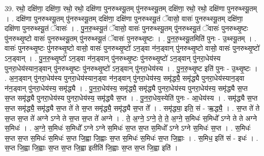 \documentclass[17pt]{extarticle}
\begin{document}
39. रथो॒ दक्षि॑णा॒ दक्षि॑णा॒ रथो॒ रथो॒ दक्षि॑णा पुनरुथ्स्यू॒तम् पु॑नरुथ्स्यू॒तम् दक्षि॑णा॒ रथो॒ रथो॒ दक्षि॑णा पुनरुथ्स्यू॒तम् । . दक्षि॑णा पुनरुथ्स्यू॒तम् पु॑नरुथ्स्यू॒तम् दक्षि॑णा॒ दक्षि॑णा पुनरुथ्स्यू॒तं ॅवासो॒ वासः॑ पुनरुथ्स्यू॒तम् दक्षि॑णा॒ दक्षि॑णा पुनरुथ्स्यू॒तं ॅवासः॑ । . पु॒न॒रु॒थ्स्यू॒तं ॅवासो॒ वासः॑ पुनरुथ्स्यू॒तम् पु॑नरुथ्स्यू॒तं ॅवासः॑ पुनरुथ्सृ॒ष्टः पु॑नरुथ्सृ॒ष्टो वासः॑ पुनरुथ्स्यू॒तम् पु॑नरुथ्स्यू॒तं ॅवासः॑ पुनरुथ्सृ॒ष्टः । . पु॒न॒रु॒थ्स्यू॒तमिति॑ पुनः - उ॒थ्स्यू॒तम् । . वासः॑ पुनरुथ्सृ॒ष्टः पु॑नरुथ्सृ॒ष्टो वासो॒ वासः॑ पुनरुथ्सृ॒ष्टो॑ ऽन॒ड्वा न॑न॒ड्वान् पु॑नरुथ्सृ॒ष्टो वासो॒ वासः॑ पुनरुथ्सृ॒ष्टो॑ ऽन॒ड्वान् । . पु॒न॒रु॒थ्सृ॒ष्टो॑ ऽन॒ड्वा न॑न॒ड्वान् पु॑नरुथ्सृ॒ष्टः पु॑नरुथ्सृ॒ष्टो॑ ऽन॒ड्वान् पु॑नरा॒धेय॑स्य पुनरा॒धेय॑स्यान॒ड्वान् पु॑नरुथ्सृ॒ष्टः पु॑नरुथ्सृ॒ष्टो॑ ऽन॒ड्वान् पु॑नरा॒धेय॑स्य । . पु॒न॒रु॒थ्सृ॒ष्ट इति॑ पुनः - उ॒थ्सृ॒ष्टः । . अ॒न॒ड्वान् पु॑नरा॒धेय॑स्य पुनरा॒धेय॑स्यान॒ड्वा न॑न॒ड्वान् पु॑नरा॒धेय॑स्य॒ समृ॑द्ध्यै॒ समृ॑द्ध्यै पुनरा॒धेय॑स्यान॒ड्वा न॑न॒ड्वान् पु॑नरा॒धेय॑स्य॒ समृ॑द्ध्यै । . पु॒न॒रा॒धेय॑स्य॒ समृ॑द्ध्यै॒ समृ॑द्ध्यै पुनरा॒धेय॑स्य पुनरा॒धेय॑स्य॒ समृ॑द्ध्यै स॒प्त स॒प्त समृ॑द्ध्यै पुनरा॒धेय॑स्य पुनरा॒धेय॑स्य॒ समृ॑द्ध्यै स॒प्त । . पु॒न॒रा॒धेय॒स्येति॑ पुनः - आ॒धेय॑स्य । . समृ॑द्ध्यै स॒प्त स॒प्त समृ॑द्ध्यै॒ समृ॑द्ध्यै स॒प्त ते॑ ते स॒प्त समृ॑द्ध्यै॒ समृ॑द्ध्यै स॒प्त ते᳚ । . समृ॑द्ध्या॒ इति॒ सं - ऋ॒द्ध्यै॒ । . स॒प्त ते॑ ते स॒प्त स॒प्त ते॑ अग्ने ऽग्ने ते स॒प्त स॒प्त ते॑ अग्ने । . ते॒ अ॒ग्ने॒ ऽग्ने॒ ते॒ ते॒ अ॒ग्ने॒ स॒मिधः॑ स॒मिधो᳚ ऽग्ने ते ते अग्ने स॒मिधः॑ । . अ॒ग्ने॒ स॒मिधः॑ स॒मिधो᳚ ऽग्ने ऽग्ने स॒मिधः॑ स॒प्त स॒प्त स॒मिधो᳚ ऽग्ने ऽग्ने स॒मिधः॑ स॒प्त । . स॒मिधः॑ स॒प्त स॒प्त स॒मिधः॑ स॒मिधः॑ स॒प्त जि॒ह्वा जि॒ह्वाः स॒प्त स॒मिधः॑ स॒मिधः॑ स॒प्त जि॒ह्वाः । . स॒मिध॒ इति॑ सं - इधः॑ । . स॒प्त जि॒ह्वा जि॒ह्वाः स॒प्त स॒प्त जि॒ह्वा इतीति॑ जि॒ह्वाः स॒प्त स॒प्त जि॒ह्वा इति॑ । \newline
\end{document}
